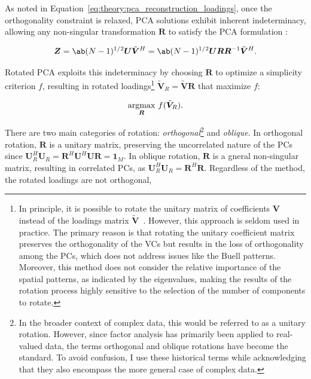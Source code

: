As noted in Equation~\eqref{eq:theory:pca_reconstruction_loadings}, once the orthogonality constraint is relaxed, PCA solutions exhibit inherent indeterminacy, allowing any non-singular transformation $\bm{R}$ to satisfy the PCA formulation \cite[e.g.][p. 305]{richman_rotation_1986}:

\begin{align}
    \bm{Z} = \ab(N-1)^{1/2} \bm{U} \tilde{\bm{V}}^H = \ab(N-1)^{1/2} \bm{U} \bm{R} \bm{R}^{-1} \tilde{\bm{V}}^H.
\end{align}

Rotated PCA exploits this indeterminacy by choosing $\bm{R}$ to optimize a simplicity criterion $f$, resulting in rotated loadings\footnote{In principle, it is possible to rotate the unitary matrix of coefficients $\bm{V}$ instead of the loadings matrix $\tilde{\bm{V}}$~\cite{mestasnunez_orthogonality_2000,jolliffe_principal_2002}. However, this approach is seldom used in practice. The primary reason is that rotating the unitary coefficient matrix preserves the orthogonality of the VCs but results in the loss of orthogonality among the PCs, which does not address issues like the Buell patterns. Moreover, this method does not consider the relative importance of the spatial patterns, as indicated by the eigenvalues, making the results of the rotation process highly sensitive to the selection of the number of components to rotate.} $\tilde{\bm{V}}_R = \tilde{\bm{V}} \bm{R}$ that maximize $f$:

\begin{align}
    \operatorname*{argmax}_{\bm{R}} \, f(\tilde{\bm{V}}_R).
\end{align}


There are two main categories of rotation: \textit{orthogonal}\footnote{In the broader context of complex data, this would be referred to as a unitary rotation. However, since factor analysis has primarily been applied to real-valued data, the terms orthogonal and oblique rotations have become the standard. To avoid confusion, I use these historical terms while acknowledging that they also encompass the more general case of complex data.} and \textit{oblique}. In orthogonal rotation, $\bm{R}$ is a unitary matrix, preserving the uncorrelated nature of the PCs since $\bm{U}_R^H\bm{U}_R = \bm{R}^H\bm{U}^H\bm{U}\bm{R} = \bm{1}_M$. In oblique rotation, $\bm{R}$ is a gneral non-singular matrix, resulting in correlated PCs, as $\bm{U}_R^H\bm{U}_R = \bm{R}^H\bm{R}$.
Regardless of the method, the rotated loadings are not orthogonal,

